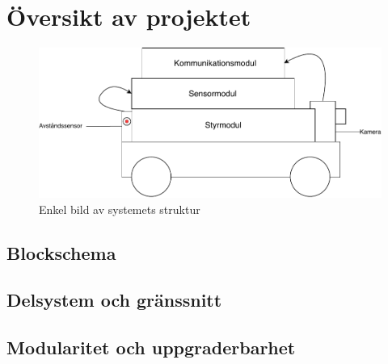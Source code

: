 \documentclass[systemskiss/skiss.tex]{subfiles}
\begin{document}
\section{Översikt av projektet}
\begin{figure}[h]
    \centering
    \includegraphics[width=0.6\linewidth]{systemskiss/figures/taxibilen.pdf}
    \caption{Enkel bild av systemets struktur}
    \label{fig:taxiskiss}
\end{figure}
\subsection{Blockschema}
\subsection{Delsystem och gränssnitt}

\subsection{Modularitet och uppgraderbarhet}
\end{document}
